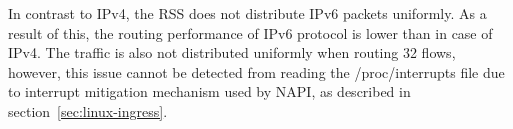 In contrast to IPv4, the RSS does not distribute IPv6 packets uniformly.
As a result of this, the routing performance of IPv6 protocol is lower than in case of IPv4.
The traffic is also not distributed uniformly when routing 32 flows,
however, this issue cannot be detected from reading the /proc/interrupts file due to
interrupt mitigation mechanism used by NAPI, as described in section~\ref{sec:linux-ingress}.
